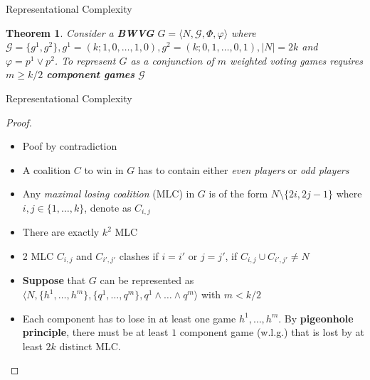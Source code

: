 \documentclass{beamer}
\begin{document}
\begin{frame}[fragile]{Representational Complexity}
  \newtheorem{theorem1}{Theorem}
  \begin{theorem1}
   Consider a \textbf{BWVG} $G = \langle N, \mathcal{G}, \Phi, \varphi \rangle$ where
   $\mathcal{G} = \{g^1, g^2\}, g^1 = (k; 1,0,\dots,1,0), g^2 = (k;0,1,\dots,0,1), |N| = 2k$
   and $\varphi = p^1 \lor p^2$. To represent $G$ as a conjunction of $m$ weighted voting games
   requires $m \geq k/2$ \textbf{component games} $\mathcal{G}$ 
  \end{theorem1}
\end{frame}

\begin{frame}[fragile]{Representational Complexity}
  \begin{proof}
    \begin{itemize}
      \item Poof by contradiction
      \item A coalition $C$ to win in $G$ has to contain either \textit{even players} or \textit{odd players}
      \item Any \textit{maximal losing coalition} (MLC) in $G$ is of the form $N \setminus \{2i, 2j - 1\}$ where
      $i,j \in \{1,\dots,k\}$, denote as $C_{i,j}$
      \item There are exactly $k^2$ MLC
      \item 2 MLC $C_{i,j}$ and $C_{i',j'}$ clashes if $i=i'$ or $j= j'$, if $C_{i,j} \cup C_{i',j'} \neq N$
      \item \textbf{Suppose} that $G$ can be represented as $\langle N, \{h^1, \dots, h^m\}, \{q^1, \dots, q^m\}, q^1 \land \dots \land q^m \rangle$ with $m < k/2$
      \item Each component has to lose in at least one game $h^1, \dots, h^m$. By \textbf{pigeonhole principle}, there must be at least $1$
      component game (w.l.g.) that is lost by at least $2k$ distinct MLC.
    \end{itemize}
  \end{proof}
\end{frame}
\end{document}
